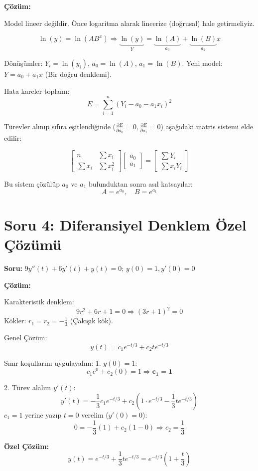\documentclass[12pt, a4paper]{article}
\begin{document}
\textbf{Çözüm:}

Model lineer değildir. Önce logaritma alarak lineerize (doğrusal) hale getirmeliyiz.

\begin{equation}
\ln(y) = \ln(A B^x) \Rightarrow \underbrace{\ln(y)}_{Y} = \underbrace{\ln(A)}_{a_0} + \underbrace{\ln(B)}_{a_1} x
\end{equation}

Dönüşümler:
$Y_i = \ln(y_i)$, $a_0 = \ln(A)$, $a_1 = \ln(B)$.
Yeni model: $Y = a_0 + a_1 x$ (Bir doğru denklemi).

Hata kareler toplamı:
\[ E = \sum_{i=1}^{n} (Y_i - a_0 - a_1 x_i)^2 \]

Türevler alınıp sıfıra eşitlendiğinde ($ \frac{\partial E}{\partial a_0}=0, \frac{\partial E}{\partial a_1}=0 $) aşağıdaki matris sistemi elde edilir:

\begin{equation}
\begin{bmatrix}
n & \sum x_i \\
\sum x_i & \sum x_i^2
\end{bmatrix}
\begin{bmatrix}
a_0 \\
a_1
\end{bmatrix}
=
\begin{bmatrix}
\sum Y_i \\
\sum x_i Y_i
\end{bmatrix}
\end{equation}

Bu sistem çözülüp $a_0$ ve $a_1$ bulunduktan sonra asıl katsayılar:
\[ A = e^{a_0}, \quad B = e^{a_1} \]

\hrulefill

\section*{Soru 4: Diferansiyel Denklem Özel Çözümü}

\textbf{Soru:} $9y''(t) + 6y'(t) + y(t) = 0$; $y(0)=1, y'(0)=0$

\textbf{Çözüm:}

Karakteristik denklem:
\[ 9r^2 + 6r + 1 = 0 \Rightarrow (3r+1)^2 = 0 \]
Kökler: $r_1 = r_2 = -\frac{1}{3}$ (Çakışık kök).

Genel Çözüm:
\begin{equation}
y(t) = c_1 e^{-t/3} + c_2 t e^{-t/3}
\end{equation}

Sınır koşullarını uygulayalım:
1. $y(0) = 1$:
\[ c_1 e^0 + c_2(0) = 1 \Rightarrow \mathbf{c_1 = 1} \]

2. Türev alalım $y'(t)$:
\[ y'(t) = -\frac{1}{3}c_1 e^{-t/3} + c_2 \left( 1 \cdot e^{-t/3} - \frac{1}{3}t e^{-t/3} \right) \]
$c_1=1$ yerine yazıp $t=0$ verelim ($y'(0)=0$):
\[ 0 = -\frac{1}{3}(1) + c_2(1 - 0) \Rightarrow c_2 = \frac{1}{3} \]

\textbf{Özel Çözüm:}
\begin{equation}
y(t) = e^{-t/3} + \frac{1}{3} t e^{-t/3} = e^{-t/3} \left( 1 + \frac{t}{3} \right)
\end{equation}
\end{document}
